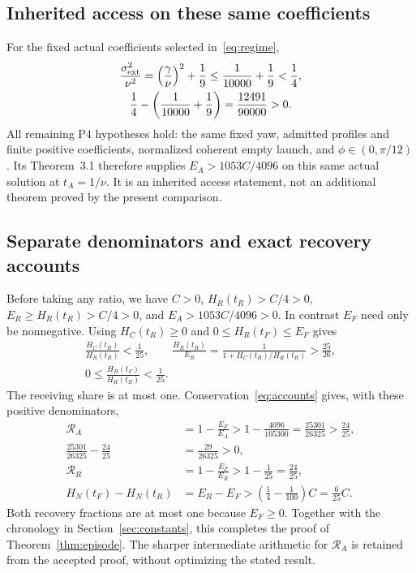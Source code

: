 \subsection{Inherited access on these same coefficients}\label{sec:access}
For the fixed actual coefficients selected in~\eqref{eq:regime},
\begin{equation}\label{eq:accesscondition}%
\begin{gathered}
 \frac{\sigma_{\rm ext}^2}{\nu^2}
 =\left(\frac{\gamma}{\nu}\right)^2+\frac19
 \le\frac1{10000}+\frac19<\frac14,\\
 \frac14-\left(\frac1{10000}+\frac19\right)
 =\frac{12491}{90000}>0 .
\end{gathered}
\end{equation}
All remaining P4 hypotheses hold: the same fixed yaw, admitted profiles and finite positive coefficients, normalized coherent empty launch, and $\phi\in(0,\pi/12)$. Its Theorem~3.1 therefore supplies
$E_A>1053C/4096$ on this same actual solution at $t_A=1/\nu$. It is an inherited access statement, not an additional theorem proved by the present comparison.

\subsection{Separate denominators and exact recovery accounts}\label{sec:ratios}
Before taking any ratio, we have
$C>0$, $H_R(t_R)>C/4>0$, $E_R\ge H_R(t_R)>C/4>0$, and
$E_A>1053C/4096>0$. In contrast $E_F$ need only be nonnegative.
Using $H_C(t_R)\ge0$ and $0\le H_R(t_F)\le E_F$ gives
\begin{equation}\label{eq:receiverratios}%
\begin{gathered}
 \frac{H_C(t_R)}{H_R(t_R)}<\frac1{25},\qquad
 \frac{H_R(t_R)}{E_R}
 =\frac1{1+H_C(t_R)/H_R(t_R)}>\frac{25}{26},\\
 0\le\frac{H_R(t_F)}{H_R(t_R)}<\frac1{25}.
\end{gathered}
\end{equation}
The receiving share is at most one. Conservation~\eqref{eq:accounts} gives, with these positive denominators,
\begin{equation}\label{eq:recoveries}%
\begin{aligned}
 \mathcal R_A
 &=1-\frac{E_F}{E_A}>
 1-\frac{4096}{105300}=\frac{25301}{26325}>\frac{24}{25},\\
 \frac{25301}{26325}-\frac{24}{25}&=\frac{29}{26325}>0,\\
 \mathcal R_R&=1-\frac{E_F}{E_R}>1-\frac1{25}=\frac{24}{25},\\
 H_N(t_F)-H_N(t_R)
 &=E_R-E_F>\left(\frac14-\frac1{100}\right)C=\frac6{25}C .
\end{aligned}
\end{equation}
Both recovery fractions are at most one because $E_F\ge0$.
Together with the chronology in Section~\ref{sec:constants}, this completes the proof of Theorem~\ref{thm:episode}. The sharper intermediate arithmetic for $\mathcal R_A$ is retained from the accepted proof, without optimizing the stated result.

